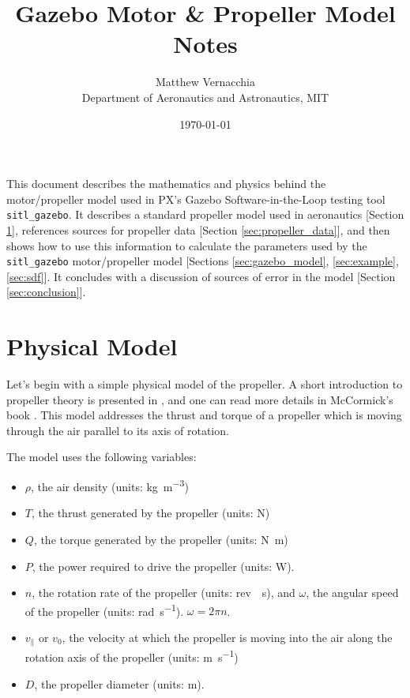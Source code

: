 \documentclass[12pt]{article}
\title{Gazebo Motor \& Propeller Model Notes}
\author{Matthew Vernacchia\\
Department of Aeronautics and Astronautics, MIT}
\date{\today}
\begin{document}
\maketitle


This document describes the mathematics and physics behind the motor/propeller model used in PX's Gazebo Software-in-the-Loop testing tool \texttt{sitl\_gazebo}. It describes a standard propeller model used in aeronautics [Section \ref{sec:physical_model}], references sources for propeller data [Section \ref{sec:propeller_data}], and then shows how to use this information to calculate the parameters used by the \texttt{sitl\_gazebo} motor/propeller model [Sections \ref{sec:gazebo_model}, \ref{sec:example}, \ref{sec:sdf}]. It concludes with a discussion of sources of error in the model [Section \ref{sec:conclusion}].


\section{Physical Model} \label{sec:physical_model}
Let's begin with a simple physical model of the propeller. A short introduction to propeller theory is presented in \cite{Unified}, and one can read more details in McCormick's book \cite{McCormick1979}. This model addresses the thrust and torque of a propeller which is moving through the air parallel to its axis of rotation.

The model uses the following variables:

\begin{itemize}
    \item $\rho$, the air density (units: \si{\kilogram\per\meter\cubed})
    \item $T$, the thrust generated by the propeller (units: \si{\newton})
    \item $Q$, the torque generated by the propeller (units: \si{\newton\meter})
    \item $P$, the power required to drive the propeller (units: \si{\watt}).
    \item $n$, the rotation rate of the propeller (units: \si{rev \per\second}), and $\omega$, the angular speed of the propeller (units: \si{\radian\per\second}). $\omega = 2 \pi n$.
    \item $v_\parallel$ or $v_0$, the velocity at which the propeller is moving into the air along the rotation axis of the propeller (units: \si{\meter\per\second})
    \item $D$, the propeller diameter (units: \si{\meter}).
\end{itemize}
\end{document}
